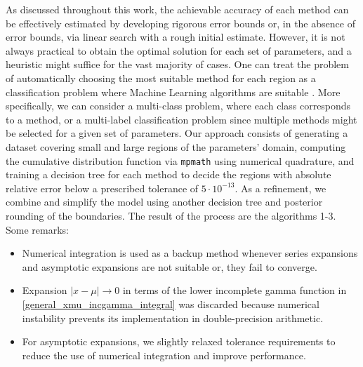 \documentclass[10pt,a4paper,oneside]{article}
\numberwithin{equation}{section}
\begin{document}
As discussed throughout this work, the achievable accuracy of each method can be effectively estimated by developing rigorous error bounds or, in the absence of error bounds, via linear search with a rough initial estimate. However, it is not always practical to obtain the optimal solution for each set of parameters, and a heuristic might suffice for the vast majority of cases. One can treat the problem of automatically choosing the most suitable method for each region as a classification problem where Machine Learning algorithms are suitable \cite{Simpson2016, Navas-Palencia2019}. More specifically, we can consider a multi-class problem, where each class corresponds to a method, or a multi-label classification problem since multiple methods might be selected for a given set of parameters.
Our approach consists of generating a dataset covering small and large regions of the parameters' domain, computing the cumulative distribution function via \texttt{mpmath} \cite{mpmath} using numerical quadrature, and training a decision tree for each method to decide the regions with absolute relative error below a prescribed tolerance of $5\cdot 10^{-13}$. As a refinement, we combine and simplify the model using another decision tree and posterior rounding of the boundaries. The result of the process are the algorithms 1-3. Some remarks:
\begin{itemize}
\item Numerical integration is used as a backup method whenever series expansions and asymptotic expansions are not suitable or, they fail to converge.
\item Expansion $|x-\mu| \to 0$ in terms of the lower incomplete gamma function in \eqref{general_xmu_incgamma_integral} was discarded because numerical instability prevents its implementation in double-precision arithmetic.
\item For asymptotic expansions, we slightly relaxed tolerance requirements to reduce the use of numerical integration and improve performance.
\end{itemize}
\end{document}
